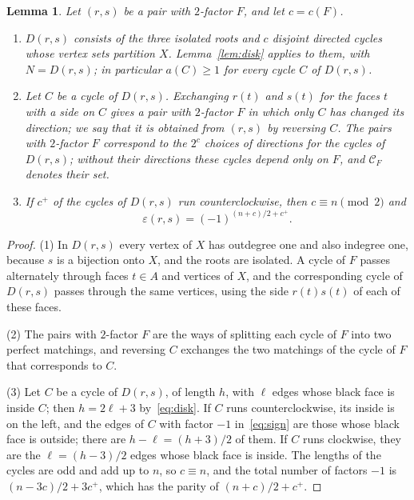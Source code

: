 \documentclass[a4paper]{amsart}
\numberwithin{equation}{section}
\newtheorem{lemma}[equation]{Lemma}
\theoremstyle{definition}
\newcommand{\eps}{\varepsilon}
\newcommand{\cC}{\mathcal C}
\begin{document}
\begin{lemma}\label{lem:D}
Let $(r,s)$ be a pair with $2$-factor $F$, and let $c=c(F)$.
\begin{enumerate}
\item $D(r,s)$ consists of the three isolated roots and $c$ disjoint directed cycles whose vertex sets partition $X$.
Lemma~\ref{lem:disk} applies to them, with $N=D(r,s)$; in particular $a(C)\ge1$ for every cycle $C$ of $D(r,s)$.
\item Let $C$ be a cycle of $D(r,s)$.
Exchanging $r(t)$ and $s(t)$ for the faces $t$ with a side on $C$ gives a pair with $2$-factor $F$ in which only $C$ has changed its direction; we say that it is obtained from $(r,s)$ by \emph{reversing} $C$.
The pairs with $2$-factor $F$ correspond to the $2^{c}$ choices of directions for the cycles of $D(r,s)$; without their directions these cycles depend only on $F$, and $\cC_F$ denotes their set.
\item If $c^+$ of the cycles of $D(r,s)$ run counterclockwise, then $c\equiv n\pmod 2$ and
\begin{equation}\label{eq:signformula}
\eps(r,s)=(-1)^{(n+c)/2+c^+}.
\end{equation}
\end{enumerate}
\end{lemma}

\begin{proof}
(1) In $D(r,s)$ every vertex of $X$ has outdegree one and also indegree one, because $s$ is a bijection onto $X$, and the roots are isolated.
A cycle of $F$ passes alternately through faces $t\in A$ and vertices of $X$, and the corresponding cycle of $D(r,s)$ passes through the same vertices, using the side $r(t)s(t)$ of each of these faces.

(2) The pairs with $2$-factor $F$ are the ways of splitting each cycle of $F$ into two perfect matchings, and reversing $C$ exchanges the two matchings of the cycle of $F$ that corresponds to $C$.

(3) Let $C$ be a cycle of $D(r,s)$, of length $h$, with $\ell$ edges whose black face is inside $C$; then $h=2\ell+3$ by~\eqref{eq:disk}.
If $C$ runs counterclockwise, its inside is on the left, and the edges of $C$ with factor $-1$ in~\eqref{eq:sign} are those whose black face is outside; there are $h-\ell=(h+3)/2$ of them.
If $C$ runs clockwise, they are the $\ell=(h-3)/2$ edges whose black face is inside.
The lengths of the cycles are odd and add up to $n$, so $c\equiv n$, and the total number of factors $-1$ is $(n-3c)/2+3c^+$, which has the parity of $(n+c)/2+c^+$.
\end{proof}
\end{document}
